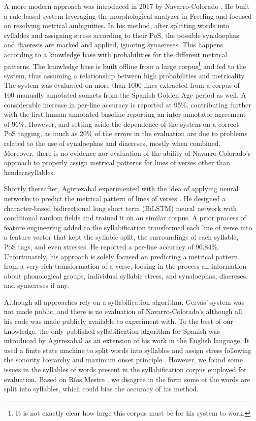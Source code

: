 \documentclass[a4paper,11pt,twocolumn,twoside]{article}
\begin{document}
A more modern approach was introduced in 2017 by Navarro-Colorado \cite{navarro2017metrical}. He built a rule-based system leveraging the morphological analyzer in Freeling \cite{navarro2017metrical,padro2012freeling} and focused on resolving metrical ambiguities. In his method, after splitting words into syllables and assigning stress according to their PoS, the possible synaloephas and diaeresis are marked and applied, ignoring synaereses. This happens according to a knowledge base with probabilities for the different metrical patterns. The knowledge base is built offline from a large corpus\footnote{It is not exactly clear how large this corpus must be for his system to work.} and fed to the system, thus assuming a relationship between high probabilities and metricality. The system was evaluated on more than 1000 lines extracted from a corpus of 100 manually annotated sonnets from the Spanish Golden Age period as well. A considerable increase in per-line accuracy is reported at 95\%, contributing further with the first human annotated baseline reporting an inter-annotator agreement of 96\%. However, and setting aside the dependence of the system on a correct PoS tagging, as much as 20\% of the errors in the evaluation are due to problems related to the use of synaloephas and diaereses, mostly when combined. Moreover, there is no evidence nor evaluation of the ability of Navarro-Colorado's approach to properly assign metrical patterns for lines of verses other than hendecasyllables.

Shortly thereafter, Agirrezabal experimented with the idea of applying neural networks to predict the metrical pattern of lines of verses \cite{agirrezabal2017comparison}. He designed a character-based bidirectional long short term (BiLSTM) neural network with conditional random fields and trained it on an similar corpus. A prior process of feature engineering added to the syllabification transformed each line of verse into a feature vector that kept the syllabic split, the surroundings of each syllable, PoS tags, and even stresses. He reported a per-line accuracy of 90.84\%. Unfortunately, his approach is solely focused on predicting a metrical pattern from a very rich transformation of a verse, loosing in the process all information about phonological groups, individual syllabic stress, and synaloephas, diaereses, and synaereses if any.

Although all approaches rely on a syllabification algorithm, Gervás' system was not made public, and there is no evaluation of Navarro-Colorado's although all his code was made publicly available to experiment with. To the best of our knowledge, the only published syllabification algorithm for Spanish was introduced by Agirrezabal as an extension of his work in the English language. It used a finite state machine to split words into syllables and assign stress following the sonority hierarchy and maximum onset principle \cite{agirrezabal2014assigning}. However, we found some issues in the syllables of words present in the syllabification corpus employed for evaluation. Based on Ríos Mestre \cite{mestre1998transcripcion}, we disagree in the form some of the words are split into syllables, which could bias the accuracy of his method.
\end{document}

